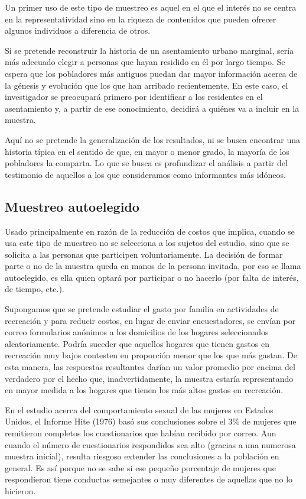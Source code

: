 \documentclass[]{book}
\begin{document}
Un primer uso de este tipo de muestreo es aquel en el que el interés no
se centra en la representatividad sino en la riqueza de contenidos que
pueden ofrecer algunos individuos a diferencia de otros.

Si se pretende reconstruir la historia de un asentamiento urbano
marginal, sería más adecuado elegir a personas que hayan residido en él
por largo tiempo. Se espera que los pobladores más antiguos puedan dar
mayor información acerca de la génesis y evolución que los que han
arribado recientemente. En este caso, el investigador se preocupará
primero por identificar a los residentes en el asentamiento y, a partir
de ese conocimiento, decidirá a quiénes va a incluir en la muestra.

Aquí no se pretende la generalización de los resultados, ni se busca
encontrar una historia típica en el sentido de que, en mayor o menor
grado, la mayoría de los pobladores la comparta. Lo que se busca es
profundizar el análisis a partir del testimonio de aquellos a los que
consideramos como informantes más idóneos.

\hypertarget{muestreo-autoelegido}{%
\subsection{Muestreo autoelegido}\label{muestreo-autoelegido}}

Usado principalmente en razón de la reducción de costos que implica,
cuando se usa este tipo de muestreo no se selecciona a los sujetos del
estudio, sino que se solicita a las personas que participen
voluntariamente. La decisión de formar parte o no de la muestra queda en
manos de la persona invitada, por eso se llama autoelegido, es ella
quien optará por participar o no hacerlo (por falta de interés, de
tiempo, etc.).

Supongamos que se pretende estudiar el gasto por familia en actividades
de recreación y para reducir costos, en lugar de enviar encuestadores,
se envían por correo formularios anónimos a los domicilios de los
hogares seleccionados aleatoriamente. Podría suceder que aquellos
hogares que tienen gastos en recreación muy bajos contesten en
proporción menor que los que más gastan. De esta manera, las respuestas
resultantes darían un valor promedio por encima del verdadero por el
hecho que, inadvertidamente, la muestra estaría representando en mayor
medida a los hogares que tienen los más altos gastos en recreación.

En el estudio acerca del comportamiento sexual de las mujeres en Estados
Unidos, el Informe Hite (1976) basó sus conclusiones sobre el 3\% de
mujeres que remitieron completos los cuestionarios que habían recibido
por correo. Aun cuando el número de cuestionarios respondidos sea alto
(gracias a una numerosa muestra inicial), resulta riesgoso extender las
conclusiones a la población en general. Es así porque no se sabe si ese
pequeño porcentaje de mujeres que respondieron tiene conductas
semejantes o muy diferentes de aquellas que no lo hicieron.
\end{document}

